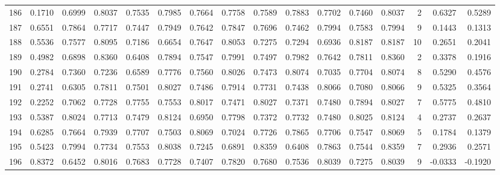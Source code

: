 \begin{tabular}{lrrrrrrrrrrrrrrr}
186 &      0.1710 &  0.6999 &  0.8037 &  0.7535 &  0.7985 &  0.7664 &  0.7758 &  0.7589 &  0.7883 &  0.7702 &   0.7460 &     0.8037 &      2 &                    0.6327 &                     0.5289 \\
187 &      0.6551 &  0.7864 &  0.7717 &  0.7447 &  0.7949 &  0.7642 &  0.7847 &  0.7696 &  0.7462 &  0.7994 &   0.7583 &     0.7994 &      9 &                    0.1443 &                     0.1313 \\
188 &      0.5536 &  0.7577 &  0.8095 &  0.7186 &  0.6654 &  0.7647 &  0.8053 &  0.7275 &  0.7294 &  0.6936 &   0.8187 &     0.8187 &     10 &                    0.2651 &                     0.2041 \\
189 &      0.4982 &  0.6898 &  0.8360 &  0.6408 &  0.7894 &  0.7547 &  0.7991 &  0.7497 &  0.7982 &  0.7642 &   0.7811 &     0.8360 &      2 &                    0.3378 &                     0.1916 \\
190 &      0.2784 &  0.7360 &  0.7236 &  0.6589 &  0.7776 &  0.7560 &  0.8026 &  0.7473 &  0.8074 &  0.7035 &   0.7704 &     0.8074 &      8 &                    0.5290 &                     0.4576 \\
191 &      0.2741 &  0.6305 &  0.7811 &  0.7501 &  0.8027 &  0.7486 &  0.7914 &  0.7731 &  0.7438 &  0.8066 &   0.7080 &     0.8066 &      9 &                    0.5325 &                     0.3564 \\
192 &      0.2252 &  0.7062 &  0.7728 &  0.7755 &  0.7553 &  0.8017 &  0.7471 &  0.8027 &  0.7371 &  0.7480 &   0.7894 &     0.8027 &      7 &                    0.5775 &                     0.4810 \\
193 &      0.5387 &  0.8024 &  0.7713 &  0.7479 &  0.8124 &  0.6950 &  0.7798 &  0.7372 &  0.7732 &  0.7480 &   0.8025 &     0.8124 &      4 &                    0.2737 &                     0.2637 \\
194 &      0.6285 &  0.7664 &  0.7939 &  0.7707 &  0.7503 &  0.8069 &  0.7024 &  0.7726 &  0.7865 &  0.7706 &   0.7547 &     0.8069 &      5 &                    0.1784 &                     0.1379 \\
195 &      0.5423 &  0.7994 &  0.7734 &  0.7553 &  0.8038 &  0.7245 &  0.6891 &  0.8359 &  0.6408 &  0.7863 &   0.7544 &     0.8359 &      7 &                    0.2936 &                     0.2571 \\
196 &      0.8372 &  0.6452 &  0.8016 &  0.7683 &  0.7728 &  0.7407 &  0.7820 &  0.7680 &  0.7536 &  0.8039 &   0.7275 &     0.8039 &      9 &                   -0.0333 &                    -0.1920 \\

\end{tabular}
